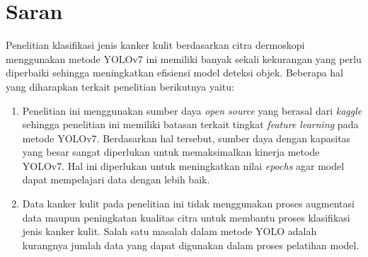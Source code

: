 \section{Saran}

Penelitian klasifikasi jenis kanker kulit berdasarkan citra dermoskopi menggunakan metode YOLOv7 ini memiliki banyak sekali kekurangan yang perlu diperbaiki sehingga meningkatkan efisiensi model deteksi objek. Beberapa hal yang diharapkan terkait penelitian berikutnya yaitu:
\begin{enumerate}
    \item Penelitian ini menggunakan sumber daya \textit{open source} yang berasal dari \textit{kaggle} sehingga penelitian ini memiliki batasan terkait tingkat \textit{feature learning} pada metode YOLOv7. Berdasarkan hal tersebut, sumber daya dengan kapasitas yang besar sangat diperlukan untuk memaksimalkan kinerja metode YOLOv7. Hal ini diperlukan untuk meningkatkan nilai \textit{epochs} agar model dapat mempelajari data dengan lebih baik.
    \item Data kanker kulit pada penelitian ini tidak menggunakan proses augmentasi data maupun peningkatan kualitas citra untuk membantu proses klasifikasi jenis kanker kulit. Salah satu masalah dalam metode YOLO adalah kurangnya jumlah data yang dapat digunakan dalam proses pelatihan model.
\end{enumerate}
